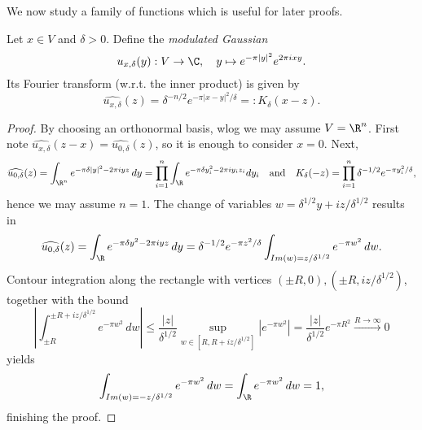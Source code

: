 We now study a family of functions which is useful for later proofs.
\begin{lemma}
\label{lem:fourier-gaussian}
\leanok
Let $x\in V$ and $\delta>0$. Define the \emph{modulated Gaussian}
$$u_{x,\delta}(y):V\to\C,\quad y\mapsto e^{-\pi|y|^2}e^{2\pi i x y}.$$
Its Fourier transform (w.r.t. the inner product) is given by
$$\widehat{u_{x,\delta}}(z)=\delta^{-n/2}e^{-\pi|x-y|^2/\delta}=:K_\delta(x-z).$$
\end{lemma}
\begin{proof}
  \leanok
  By choosing an orthonormal basis, wlog we may assume $V=\R^n$.
  First note $\widehat{u_{x,\delta}}(z-x)=\widehat{u_{0,\delta}}(z)$, so it is enough to consider $x=0$.
  Next, $$\widehat{u_{0,\delta}}(z)=\int_{\R^n}e^{-\pi\delta|y|^2-2\pi iyz}\,dy=
  \prod_{i=1}^n\int_{\R}e^{-\pi\delta y_i^2-2\pi iy_iz_i}dy_i\quad\text{and}\quad
  K_\delta(-z)=\prod_{i=1}^n\delta^{-1/2}e^{-\pi y_i^2/\delta},$$ hence we may assume $n=1$.
  The change of variables $w=\delta^{1/2}y+iz/\delta^{1/2}$ results in
  $$\widehat{u_{0,\delta}}(z)=\int_{\R} e^{-\pi\delta y^2-2\pi i y z}\,dy=
  \delta^{-1/2}e^{-\pi z^2/\delta}\int_{Im(w)=z/\delta^{1/2}}e^{-\pi w^2}\,dw.$$
  Contour integration along the rectangle with vertices $(\pm R,0),(\pm R,iz/\delta^{1/2})$, together
  with the bound $$\left|\int_{\pm R}^{\pm R+iz/\delta^{1/2}}e^{-\pi w^2}\,dw\right|\leq
  \frac{|z|}{\delta^{1/2}}\sup_{w\in[R,R+iz/\delta^{1/2}]}|e^{-\pi w^2}|=
  \frac{|z|}{\delta^{1/2}}e^{-\pi R^2}\xrightarrow{R\to\infty}0$$
  yields
  $$\int_{Im(w)=-z/\delta^{1/2}}e^{-\pi w^2}\,dw=
  \int_{\R} e^{-\pi w^2}\,dw=1,$$ finishing the proof.
\end{proof}

